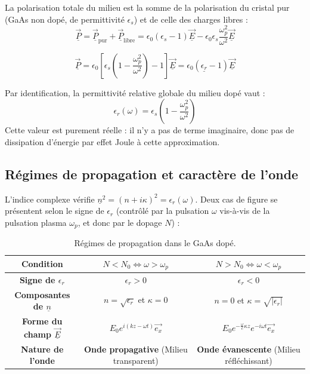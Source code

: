 \documentclass[french]{yLectureNote}
\renewcommand{\vec}{\overrightarrow}
\begin{document}
La polarisation totale du milieu est la somme de la polarisation du cristal pur (GaAs non dopé, de permittivité $\epsilon_s$) et de celle des charges libres :
$$\underline{\vec{P}} = \underline{\vec{P}}_{\text{pur}} + \underline{\vec{P}}_{\text{libre}} = \epsilon_0(\epsilon_s - 1)\underline{\vec{E}} - \epsilon_0 \epsilon_s \frac{\omega_p^2}{\omega^2}\underline{\vec{E}}$$

$$\underline{\vec{P}} = \epsilon_0 \left[ \epsilon_s \left(1 - \frac{\omega_p^2}{\omega^2}\right) - 1 \right] \underline{\vec{E}} = \epsilon_0 (\underline{\epsilon_r} - 1)\underline{\vec{E}}$$

Par identification, la permittivité relative globale du milieu dopé vaut :
$$\epsilon_r(\omega) = \epsilon_s \left(1 - \frac{\omega_p^2}{\omega^2}\right)$$
Cette valeur est purement réelle : il n'y a pas de terme imaginaire, donc pas de dissipation d'énergie par effet Joule à cette approximation.

\subsection{Régimes de propagation et caractère de l'onde}

L'indice complexe vérifie $\underline{n}^2 = (n+i\kappa)^2 = \epsilon_r(\omega)$. Deux cas de figure se présentent selon le signe de $\epsilon_r$ (contrôlé par la pulsation $\omega$ vis-à-vis de la pulsation plasma $\omega_p$, et donc par le dopage $N$) :

\begin{table}[h!]
\centering
\begin{tabular}{|c|c|c|}
\hline
\textbf{Condition} & $N < N_0 \iff \omega > \omega_p$ & $N > N_0 \iff \omega < \omega_p$ \\ \hline
\textbf{Signe de $\epsilon_r$} & $\epsilon_r > 0$ & $\epsilon_r < 0$ \\ \hline
\textbf{Composantes de $\underline{n}$} & $n = \sqrt{\epsilon_r}$ et $\kappa = 0$ & $n = 0$ et $\kappa = \sqrt{|\epsilon_r|}$ \\ \hline
\textbf{Forme du champ $\underline{\vec{E}}$} & $E_0 e^{i(kz-\omega t)}\vec{e_x}$ & $E_0 e^{-\frac{\omega}{c}\kappa z} e^{-i\omega t}\vec{e_x}$ \\ \hline
\textbf{Nature de l'onde} & \textbf{Onde propagative} (Milieu transparent) & \textbf{Onde évanescente} (Milieu réfléchissant) \\ \hline
\end{tabular}
\caption{Régimes de propagation dans le GaAs dopé.}
\end{table}
\end{document}
